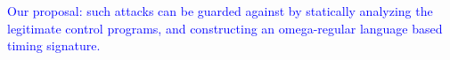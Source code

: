 \begin{frame}
\item \tiny{\textcolor{blue}{Our proposal: such
attacks can be guarded against by statically analyzing the
legitimate control programs, and constructing an omega-regular language based timing signature.}}



\end{frame}


